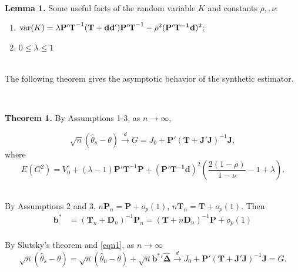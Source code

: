 \documentclass{article}
\begin{document}
~\\

\begin{flushleft}
\textbf{Lemma 1.} Some useful facts of the random variable $K$ and constants $\rho, , \nu$:
\end{flushleft}
\begin{enumerate}
    \item  $\mbox{var}(K) =   \lambda \mathbf{P'T}^{-1} (\mathbf T + \mathbf{dd'}) \mathbf{P'T}^{-1}  - \rho^2 (\mathbf{P'T^{-1}d})^2;$
    \item $0 \le \lambda \le 1$
\end{enumerate}

~\\

The following theorem gives the asymptotic behavior of the synthetic estimator. 

~\\

\begin{flushleft}
\textbf{Theorem 1.} By Assumptions 1-3, as $n\to \infty$, 
\end{flushleft}
\begin{displaymath}
\sqrt{n} (\hat \theta_s - \theta) 
\xrightarrow{d} G = J_0 + \mathbf P'  (\mathbf T +  \mathbf{J'J} )^{-1} \mathbf J, 
\end{displaymath}
where 
\begin{displaymath}
E(G^2) =  V_0 +    (\lambda-1)\mathbf{P'T}^{-1} \mathbf P + (\mathbf{P'T^{-1}d} )^2 (\frac{2(1-\rho)}{1-\nu} - 1 +\lambda).
\end{displaymath}

~\\

\proof
By Assumptions 2 and 3, $n\mathbf P_n = \mathbf P + o_p(1)$, $n\mathbf T_n = \mathbf T + o_p(1)$. Then
\begin{equation}\begin{split}\label{eqn1}
\mathbf b^* &=
 (\mathbf T_n + \mathbf D_n)^{-1}\mathbf P_n 
 =(\mathbf T + n\mathbf D_n)^{-1}\mathbf P+ o_p(1) \\
\end{split}\end{equation}

By Slutsky's theorem and \eqref{eqn1}, as $n \to \infty$
\begin{displaymath}
\sqrt{n} (\hat \theta_s - \theta) =  \sqrt{n} (\hat\theta_0 - \theta) + 
\sqrt{n} \mathbf {b^*}' \boldsymbol{\hat \Delta} 
\xrightarrow{d} J_0 + 
\mathbf P' (\mathbf T + \mathbf{J'J})^{-1} \mathbf J = G. 
 \end{displaymath}
\end{document}
